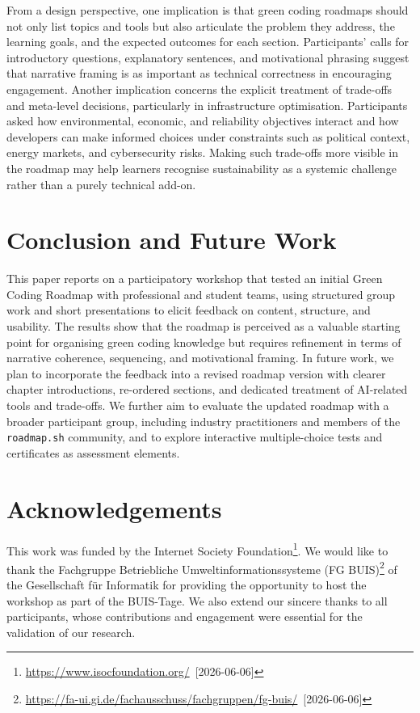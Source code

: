 \documentclass[english]{lni}
\begin{document}
From a design perspective, one implication is that green coding roadmaps should not only list topics and tools but also articulate the problem they address, the learning goals, and the expected outcomes for each section. Participants' calls for introductory questions, explanatory sentences, and motivational phrasing suggest that narrative framing is as important as technical correctness in encouraging engagement.
Another implication concerns the explicit treatment of trade-offs and meta-level decisions, particularly in infrastructure optimisation. Participants asked how environmental, economic, and reliability objectives interact and how developers can make informed choices under constraints such as political context, energy markets, and cybersecurity risks. Making such trade-offs more visible in the roadmap may help learners recognise sustainability as a systemic challenge rather than a purely technical add-on.

\section{Conclusion and Future Work}
This paper reports on a participatory workshop that tested an initial Green Coding Roadmap with professional and student teams, using structured group work and short presentations to elicit feedback on content, structure, and usability. The results show that the roadmap is perceived as a valuable starting point for organising green coding knowledge but requires refinement in terms of narrative coherence, sequencing, and motivational framing.
In future work, we plan to incorporate the feedback into a revised roadmap version with clearer chapter introductions, re-ordered sections, and dedicated treatment of AI-related tools and trade-offs. We further aim to evaluate the updated roadmap with a broader participant group, including industry practitioners and members of the \texttt{roadmap.sh} community, and to explore interactive multiple-choice tests and certificates as assessment elements.

\section*{Acknowledgements}
This work was funded by the Internet Society Foundation\footnote{\url{https://www.isocfoundation.org/}~[2026-06-06]}. We would like to thank the Fachgruppe Betriebliche Umweltinformationssysteme (FG BUIS)\footnote{\url{https://fa-ui.gi.de/fachausschuss/fachgruppen/fg-buis/}~[2026-06-06]} of the Gesellschaft für Informatik for providing the opportunity to host the workshop as part of the BUIS-Tage. We also extend our sincere thanks to all participants, whose contributions and engagement were essential for the validation of our research.



\printbibliography
\end{document}
